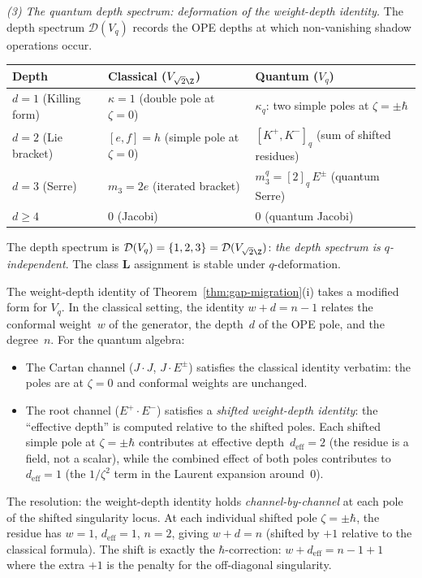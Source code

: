 \begin{conjecture}
\smallskip
\noindent
\emph{(3) The quantum depth spectrum: deformation of the weight-depth identity.}
The depth spectrum $\mathcal{D}(V_q)$ records the OPE depths
at which non-vanishing shadow operations occur.

\begin{center}
\small
\renewcommand{\arraystretch}{1.3}
\begin{tabular}{lll}
\toprule
\textbf{Depth} & \textbf{Classical}
($V_{\sqrt{2}\Z}$) & \textbf{Quantum} ($V_q$) \\
\midrule
$d = 1$ (Killing form) & $\kappa = 1$ (double pole at
$\zeta = 0$) & $\kappa_q$: two simple poles at
$\zeta = \pm\hbar$ \\
$d = 2$ (Lie bracket) & $[e,f] = h$ (simple pole at
$\zeta = 0$) & $[K^+,K^-]_q$ (sum of shifted residues) \\
$d = 3$ (Serre) & $m_3 = 2e$ (iterated bracket) &
$m_3^q = [2]_q\,E^\pm$ (quantum Serre) \\
$d \ge 4$ & $0$ (Jacobi) & $0$ (quantum Jacobi) \\
\bottomrule
\end{tabular}
\end{center}
\noindent
The depth spectrum is $\mathcal{D}(V_q) = \{1, 2, 3\}
= \mathcal{D}(V_{\sqrt{2}\Z})$: \emph{the depth spectrum is
$q$-independent}. The class $\mathbf{L}$ assignment is
stable under $q$-deformation.

The weight-depth identity of
Theorem~\ref{thm:gap-migration}(i) takes a modified form
for $V_q$. In the classical setting, the identity
$w + d = n - 1$ relates the conformal weight~$w$ of
the generator, the depth~$d$ of the OPE pole, and the
degree~$n$. For the quantum algebra:
\begin{itemize}[nosep]
\item The Cartan channel ($J \cdot J$, $J \cdot E^\pm$)
 satisfies the classical identity verbatim: the poles
 are at $\zeta = 0$ and conformal weights are unchanged.
\item The root channel ($E^+ \cdot E^-$) satisfies a
 \emph{shifted weight-depth identity}: the ``effective
 depth'' is computed relative to the shifted poles.
 Each shifted simple pole at $\zeta = \pm\hbar$
 contributes at effective depth~$d_{\mathrm{eff}} = 2$
 (the residue is a field, not a scalar), while the
 combined effect of both poles contributes to
 $d_{\mathrm{eff}} = 1$ (the $1/\zeta^2$ term in the
 Laurent expansion around~$0$).
\end{itemize}
The resolution: the weight-depth identity holds
\emph{channel-by-channel} at each pole of the shifted
singularity locus. At each individual shifted pole
$\zeta = \pm\hbar$, the residue has $w = 1$,
$d_{\mathrm{eff}} = 1$, $n = 2$, giving $w + d = n$
(shifted by $+1$ relative to the classical formula).
The shift is exactly the $\hbar$-correction:
$w + d_{\mathrm{eff}} = n - 1 + 1$ where the extra $+1$
is the penalty for the off-diagonal singularity.


\end{conjecture}

